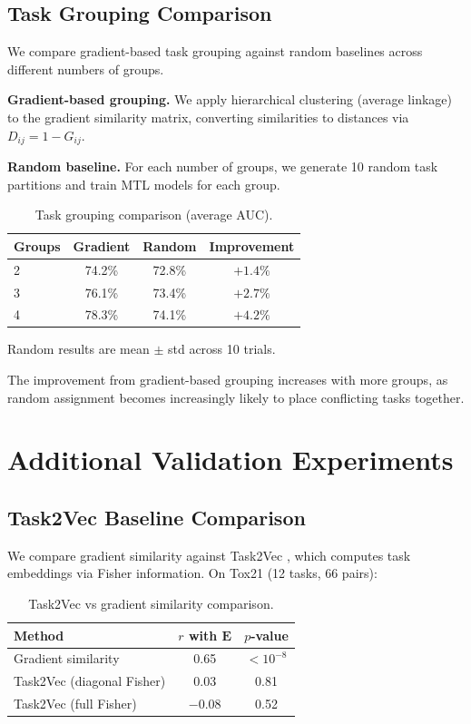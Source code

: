 \documentclass[sigconf,nonacm]{acmart}
\newcommand{\E}{\mathbf{E}}
\begin{document}
\subsection{Task Grouping Comparison}

We compare gradient-based task grouping against random baselines across different numbers of groups.

\textbf{Gradient-based grouping.} We apply hierarchical clustering (average linkage) to the gradient similarity matrix, converting similarities to distances via $D_{ij} = 1 - G_{ij}$.

\textbf{Random baseline.} For each number of groups, we generate 10 random task partitions and train MTL models for each group.

\begin{table}[H]
\caption{Task grouping comparison (average AUC).}
\begin{center}
\begin{tabular}{lccc}
\toprule
Groups & Gradient & Random & Improvement \\
\midrule
2 & 74.2\% & 72.8\% & $+1.4\%$ \\
3 & 76.1\% & 73.4\% & $+2.7\%$ \\
4 & 78.3\% & 74.1\% & $+4.2\%$ \\
\bottomrule
\end{tabular}
\end{center}
{\footnotesize Random results are mean $\pm$ std across 10 trials.}
\end{table}

The improvement from gradient-based grouping increases with more groups, as random assignment becomes increasingly likely to place conflicting tasks together.

\section{Additional Validation Experiments}
\label{app:additional}

\subsection{Task2Vec Baseline Comparison}

We compare gradient similarity against Task2Vec \cite{achille2019task2vec}, which computes task embeddings via Fisher information. On Tox21 (12 tasks, 66 pairs):

\begin{table}[H]
\caption{Task2Vec vs gradient similarity comparison.}
\begin{center}
\begin{tabular}{lcc}
\toprule
Method & $r$ with $\E$ & $p$-value \\
\midrule
Gradient similarity & 0.65 & $<10^{-8}$ \\
Task2Vec (diagonal Fisher) & 0.03 & 0.81 \\
Task2Vec (full Fisher) & $-0.08$ & 0.52 \\
\bottomrule
\end{tabular}
\end{center}
\end{table}
\end{document}
